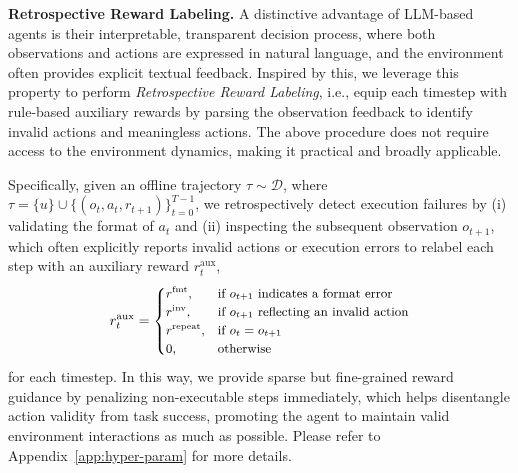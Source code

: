 \documentclass{article}
\theoremstyle{plain}
\theoremstyle{definition}
\theoremstyle{remark}
\begin{document}
\textbf{Retrospective Reward Labeling.}
A distinctive advantage of LLM-based agents is their interpretable, transparent decision process, where both observations and actions are expressed in natural language, and the environment often provides explicit textual feedback. Inspired by this, we leverage this property to perform \emph{Retrospective Reward Labeling}, i.e., equip each timestep with rule-based auxiliary rewards by parsing the observation feedback to identify invalid actions and meaningless actions.
The above procedure does not require access to the environment dynamics, making it practical and broadly applicable.

Specifically, given an offline trajectory $\tau\sim\mathcal{D}$, where $\tau=\{u\}\cup\{(o_t, a_t, r_{t+1})\}_{t=0}^{T-1}$,
we retrospectively detect execution failures by (i) validating the format of $a_t$ and (ii) inspecting the subsequent observation $o_{t+1}$, which often explicitly reports invalid actions or execution errors to relabel each step with an auxiliary reward ${r}^{\text{aux}}_t$,
\begin{equation}
\small
{r}^{\text{aux}}_t =
\begin{cases}
r^{\text{fmt}}, & \text{if } o_{t+1} \text{ indicates a format error}\\
r^{\text{inv}}, & \text{if } o_{t+1} \text{ reflecting an invalid action}\\
r^{\text{repeat}}, & \text{if }  o_{t}=o_{t+1}\\
0, & \text{otherwise}
\end{cases}
\label{eq:hrr-invalid}
\end{equation}
for each timestep. 
In this way, we provide sparse but fine-grained reward guidance by
penalizing non-executable steps immediately, which helps disentangle action validity from task success, promoting the agent to maintain valid environment interactions as much as possible. Please refer to Appendix~\ref{app:hyper-param} for more details.
\end{document}
